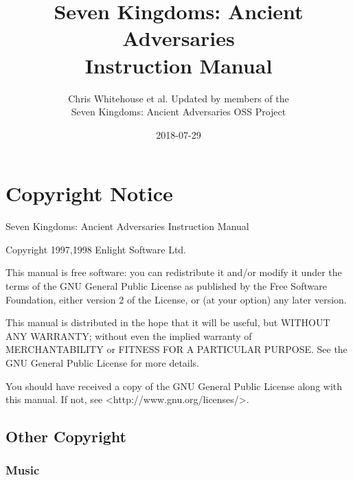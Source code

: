 \documentclass[openany]{book}
\begin{document}
\begin{titlepage}

	\title{Seven Kingdoms: Ancient Adversaries \\
		Instruction Manual}
	\author{Chris Whitehouse et al. Updated by members of the \\
		Seven Kingdoms: Ancient Adversaries OSS Project} %
	\date{2018-07-29} %

\end{titlepage}
\frontmatter
\maketitle

\section{Copyright Notice}

Seven Kingdoms: Ancient Adversaries Instruction Manual

Copyright 1997,1998 Enlight Software Ltd.

This manual is free software: you can redistribute it and/or modify it under the terms of the GNU General Public License as published by the Free Software Foundation, either version 2 of the License, or (at your option) any later version.

This manual is distributed in the hope that it will be useful, but WITHOUT ANY WARRANTY; without even the implied warranty of MERCHANTABILITY or FITNESS FOR A PARTICULAR PURPOSE.  See the GNU General Public License for more details.

You should have received a copy of the GNU General Public License along with this manual.  If not, see <http://www.gnu.org/licenses/>.

\subsection{Other Copyright}

\subsubsection{Music}
\end{document}
